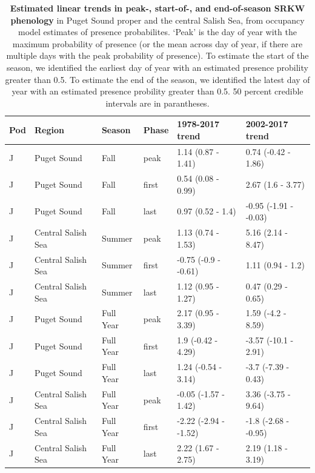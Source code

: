 \documentclass{article}
\begin{document}
\begin{table}[ht]
\centering
\caption{\textbf{Estimated linear trends in peak-, start-of-, and end-of-season SRKW phenology} in Puget Sound proper and the central Salish Sea, from occupancy model estimates of presence probabilites. `Peak' is the day of year with the maximum probability of presence (or the mean across day of year, if there are multiple days with the peak probability of presence). To estimate the start of the season, we identified the earliest day of year with an estimated presence probility greater than 0.5. To estimate the end of the season, we identified the latest day of year with an estimated presence probility greater than 0.5. 50 percent credible intervals are in parantheses.} 
\label{tab:modsz}
\begingroup\footnotesize
\begin{tabular}{|p{}|p{}|p{}|p{}|p{}|p{}|}
  \hline
Pod & Region & Season & Phase & 1978-2017 trend & 2002-2017 trend \\ 
  \hline
J & Puget Sound & Fall & peak & 1.14 (0.87 - 1.41) & 0.74 (-0.42 - 1.86) \\ 
  J & Puget Sound & Fall & first & 0.54 (0.08 - 0.99) & 2.67 (1.6 - 3.77) \\ 
  J & Puget Sound & Fall & last & 0.97 (0.52 - 1.4) & -0.95 (-1.91 - -0.03) \\ 
  J & Central Salish Sea & Summer & peak & 1.13 (0.74 - 1.53) & 5.16 (2.14 - 8.47) \\ 
  J & Central Salish Sea & Summer & first & -0.75 (-0.9 - -0.61) & 1.11 (0.94 - 1.2) \\ 
  J & Central Salish Sea & Summer & last & 1.12 (0.95 - 1.27) & 0.47 (0.29 - 0.65) \\ 
  J & Puget Sound & Full Year & peak & 2.17 (0.95 - 3.39) & 1.59 (-4.2 - 8.59) \\ 
  J & Puget Sound & Full Year & first & 1.9 (-0.42 - 4.29) & -3.57 (-10.1 - 2.91) \\ 
  J & Puget Sound & Full Year & last & 1.24 (-0.54 - 3.14) & -3.7 (-7.39 - 0.43) \\ 
  J & Central Salish Sea & Full Year & peak & -0.05 (-1.57 - 1.42) & 3.36 (-3.75 - 9.64) \\ 
  J & Central Salish Sea & Full Year & first & -2.22 (-2.94 - -1.52) & -1.8 (-2.68 - -0.95) \\ 
  J & Central Salish Sea & Full Year & last & 2.22 (1.67 - 2.75) & 2.19 (1.18 - 3.19) \\ 

\end{tabular}
\end{table}
\end{document}
